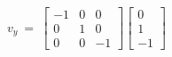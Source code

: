 \documentclass[preview]{standalone}
\begin{document}
\begin{align*}
v_y\ =\ \begin{bmatrix}
                        -1 & 0 & 0\\
                        0 & 1 & 0 \\
                        0 & 0 & -1
                        \end{bmatrix}\begin{bmatrix}
                        0\\
                        1\\
                        -1
                        \end{bmatrix}\\
\end{align*}
\end{document}
